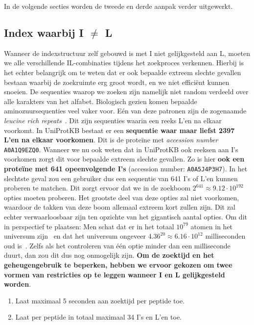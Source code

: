 In de volgende secties worden de tweede en derde aanpak verder uitgewerkt.

\subsection{Index waarbij I $\neq$ L}\label{subsec:index-waarbij-i-neq-l}
Wanneer de indexstructuur zelf gebouwd is met I niet gelijkgesteld aan L, moeten we alle verschillende IL-combinaties tijdens het zoekproces verkennen.
Hierbij is het echter belangrijk om te weten dat er ook bepaalde extreem slechte gevallen bestaan waarbij de zoekruimte erg groot wordt, en we niet efficiënt kunnen snoeien.
De sequenties waarop we zoeken zijn namelijk niet random verdeeld over alle karakters van het alfabet.
Biologisch gezien komen bepaalde aminozuursequenties veel vaker voor.
Eén van deze patronen zijn de zogenaamde \textit{leucine rich repeats}~\cite{leucine_rich_repeats}.
Dit zijn sequenties waarin een reeks L'en na elkaar voorkomt.
In UniProtKB bestaat er een \textbf{sequentie waar maar liefst 2397 L'en na elkaar voorkomen}.
Dit is de proteïne met \textit{accession number} \texttt{A0A1Q9EZQ0}.
Wanneer we nu ook weten dat in UniProtKB ook reeksen aan I's voorkomen zorgt dit voor bepaalde extreem slechte gevallen.
Zo is hier \textbf{ook een proteïne met 641 opeenvolgende I's} (accession number: \texttt{A0A5J4P3H7}).
In het slechtste geval zou een gebruiker dus een sequentie van 641 I's of L'en kunnen proberen te matchen.
Dit zorgt ervoor dat we in de zoekboom $2^{641} \approx 9.12 \cdot 10^{192}$ opties moeten proberen.
Het grootste deel van deze opties zal niet voorkomen, waardoor de takken van deze boom allemaal extreem kort zullen zijn.
Dit zal echter verwaarloosbaar zijn ten opzichte van het gigantisch aantal opties.
Om dit in perspectief te plaatsen: Men schat dat er in het totaal $10^{79}$ atomen in het universum zijn~\cite{atoms_in_universe} en dat het universum ongeveer $4.36^{20} \approx 6.16 \cdot 10^{12}$ milliseconden oud is~\cite{age_universe}.
Zelfs als het controleren van één optie minder dan een milliseconde duurt, dan zou dit dus nog onmogelijk zijn.
\textbf{Om de zoektijd en het geheugengebruik te beperken, hebben we ervoor gekozen om twee vormen van restricties op te leggen wanneer I en L gelijkgesteld worden}.
\begin{enumerate}
    \item Laat maximaal 5 seconden aan zoektijd per peptide toe.
    \item Laat per peptide in totaal maximaal 34 I's en L'en toe.
\end{enumerate}
